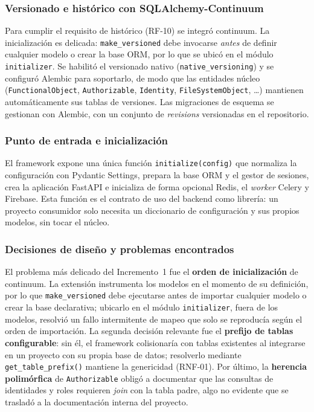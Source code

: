 \subsubsection{Versionado e histórico con SQLAlchemy-Continuum}
Para cumplir el requisito de histórico (RF-10) se integró
\gls{continuum}. La inicialización es delicada: \texttt{make\_\allowbreak versioned} debe
invocarse \emph{antes} de definir cualquier modelo o crear la base ORM, por lo
que se ubicó en el módulo \texttt{initializer}. Se habilitó el versionado
nativo (\texttt{native\_versioning}) y se configuró Alembic para soportarlo,
de modo que las entidades núcleo (\texttt{FunctionalObject},
\texttt{Authorizable}, \texttt{Identity}, \texttt{FileSystemObject}, \ldots)
mantienen automáticamente sus tablas de versiones. Las migraciones de esquema
se gestionan con Alembic, con un conjunto de \emph{revisions} versionadas en
el repositorio.

\subsubsection{Punto de entrada e inicialización}
El framework expone una única función \texttt{initialize(config)} que
normaliza la configuración con Pydantic Settings, prepara la base ORM y el
gestor de sesiones, crea la aplicación FastAPI e inicializa de forma opcional
Redis, el \emph{worker} Celery y Firebase. Esta función es el contrato de uso
del backend como librería: un proyecto consumidor solo necesita un diccionario
de configuración y sus propios modelos, sin tocar el núcleo.

\subsubsection{Decisiones de diseño y problemas encontrados}
El problema más delicado del Incremento~1 fue el \textbf{orden de
inicialización} de \gls{continuum}. La extensión instrumenta los modelos en el
momento de su definición, por lo que \texttt{make\_\allowbreak versioned} debe ejecutarse
antes de importar cualquier modelo o crear la base declarativa; ubicarlo en el
módulo \texttt{initializer}, fuera de los modelos, resolvió un fallo
intermitente de mapeo que solo se reproducía según el orden de importación. La
segunda decisión relevante fue el \textbf{prefijo de tablas configurable}: sin
él, el framework colisionaría con tablas existentes al integrarse en un
proyecto con su propia base de datos; resolverlo mediante
\texttt{get\_table\_prefix()} mantiene la genericidad (RNF-01). Por último, la
\textbf{herencia polimórfica} de \texttt{Authorizable} obligó a documentar que
las consultas de identidades y roles requieren \emph{join} con la tabla padre,
algo no evidente que se trasladó a la documentación interna del proyecto.

